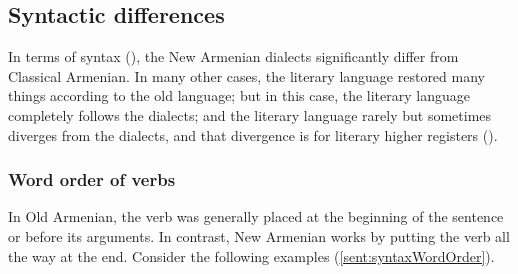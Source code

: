 \subsection{Syntactic differences}

In terms of syntax (), the New Armenian dialects significantly differ from Classical Armenian. In many other cases, the literary language restored many things according to the old language; but in this case, the literary language completely follows the dialects; and the literary language rarely but sometimes diverges from the dialects, and that divergence is for literary higher registers ().%

\subsubsection{Word order of verbs}

In Old Armenian, the verb was generally placed at the beginning of the sentence or before its arguments. In contrast, New Armenian works by putting the verb all the way at the end. Consider the following examples (\ref{sent:syntaxWordOrder}).%

